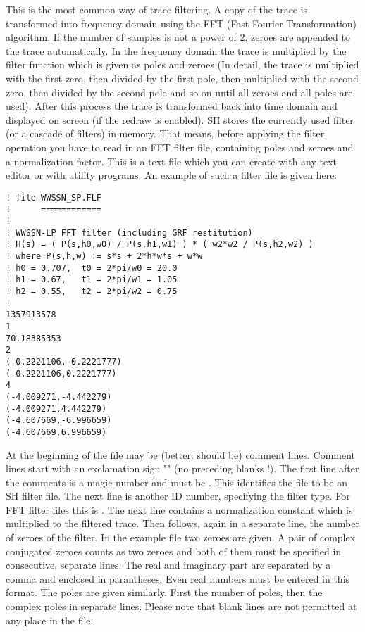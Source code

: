 This is the most common way of trace filtering.  A copy of the trace
is transformed into frequency domain using the FFT (Fast Fourier
Transformation) algorithm.  If the number of samples is not a
power of 2, zeroes are appended to the trace automatically.
In the frequency domain the trace is multiplied by the filter
function which is given as poles and zeroes (In detail, the
trace is multiplied with the first zero, then divided by the
first pole, then multiplied with the second zero, then divided
by the second pole and so on until all zeroes and all poles
are used).  After this process the trace is transformed back
into time domain and displayed on screen (if the redraw is
enabled).  SH stores the currently used filter (or a cascade of
filters) in memory.  That means, before applying the filter operation
you have to read in an FFT filter file, containing poles and zeroes
and a normalization factor.  This is a text file which you can
create with any text editor or with utility programs.  An example of
such a filter file is given here:

\begin{verbatim}
! file WWSSN_SP.FLF
!      ============
!
! WWSSN-LP FFT filter (including GRF restitution)
! H(s) = ( P(s,h0,w0) / P(s,h1,w1) ) * ( w2*w2 / P(s,h2,w2) )
! where P(s,h,w) := s*s + 2*h*w*s + w*w
! h0 = 0.707,  t0 = 2*pi/w0 = 20.0
! h1 = 0.67,   t1 = 2*pi/w1 = 1.05
! h2 = 0.55,   t2 = 2*pi/w2 = 0.75
!
1357913578
1
70.18385353
2
(-0.2221106,-0.2221777)
(-0.2221106,0.2221777)
4
(-4.009271,-4.442279)
(-4.009271,4.442279)
(-4.607669,-6.996659)
(-4.607669,6.996659)
\end{verbatim}

\noindent
At the beginning of the file may be (better: should be) comment
lines.  Comment lines start with an exclamation sign "\exm{!}" (no
preceding blanks !).  The first line after the comments is a magic
number and must be .  This identifies the file
to be an SH filter file.  The next line is another ID number,
specifying the filter type.  For FFT filter files this is .
The next line contains a normalization constant which is multiplied
to the filtered trace.  Then follows, again in a separate line, the
number of zeroes of the filter.  In the example file two zeroes are
given.  A pair of complex conjugated zeroes counts as two
zeroes and both of them must be specified in consecutive, separate
lines.  The real and imaginary part are separated by a comma and
enclosed in parantheses.  Even real numbers must be entered in this
format.  The poles are given similarly.  First the number
of poles, then the complex poles in separate lines.  Please note
that blank lines are not permitted at any place in the file.

